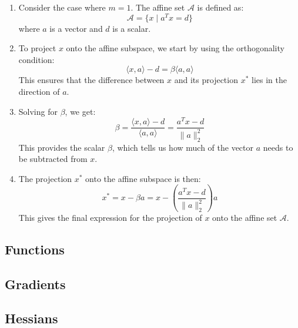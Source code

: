         \begin{example}
            \begin{enumerate}
                \item Consider the case where \( m = 1 \). The affine set \( \mathcal{A} \) is defined as:
                \[
                \mathcal{A} = \{ x \mid a^T x = d \}
                \]
                where \( a \) is a vector and \( d \) is a scalar.
            
                \item To project \( x \) onto the affine subspace, we start by using the orthogonality condition:
                \[
                \langle x, a \rangle - d = \beta \langle a, a \rangle
                \]
                This ensures that the difference between \( x \) and its projection \( x^* \) lies in the direction of \( a \).
            
                \item Solving for \( \beta \), we get:
                \[
                \beta = \frac{\langle x, a \rangle - d}{\langle a, a \rangle} = \frac{a^T x - d}{\| a \|_2^2}
                \]
                This provides the scalar \( \beta \), which tells us how much of the vector \( a \) needs to be subtracted from \( x \).
            
                \item The projection \( x^* \) onto the affine subspace is then:
                \[
                x^* = x - \beta a = x - \left( \frac{a^T x - d}{\| a \|_2^2} \right) a
                \]
                This gives the final expression for the projection of \( x \) onto the affine set \( \mathcal{A} \).
            \end{enumerate}            
        \end{example}
\subsection{Functions}
\subsection{Gradients}
\subsection{Hessians}